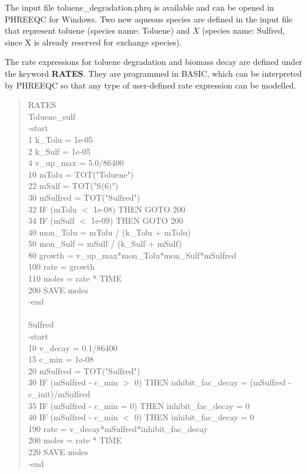 The input file {\color{red}toluene\_degradation.phrq} is available and can be opened
in PHREEQC for Windows. Two new aqueous species are defined in the input file that represent toluene (species name: Toluene) and $X$ (species name: Sulfred, since X is already reserved for exchange species). 

The rate expressions for toluene degradation and biomass decay are defined under the keyword \textbf{RATES}. They are programmed in BASIC, which can be interpreted by PHREEQC so that any type of user-defined rate expression can be modelled.

\begin{quote}
{\color{red}
	RATES \\
	Toluene\_sulf \\
    -start \\
    1   k\_Tolu    = 1e-05 \\
    2   k\_Sulf    = 1e-05 \\
    4   v\_up\_max  = 5.0/86400 \\
    10  mTolu     = TOT("Toluene") \\
    22  mSulf     = TOT("S(6)") \\
    30  mSulfred  = TOT("Sulfred") \\
    32  IF (mTolu $<$ 1e-08) THEN GOTO 200 \\
    34  IF (mSulf $<$ 1e-09) THEN GOTO 200 \\
    40  mon\_Tolu  = mTolu / (k\_Tolu + mTolu) \\
    50  mon\_Sulf  = mSulf / (k\_Sulf + mSulf) \\
    80  growth    = v\_up\_max*mon\_Tolu*mon\_Sulf*mSulfred \\
    100 rate      = growth \\
    110 moles     = rate * TIME \\
    200 SAVE moles \\
    -end \\ 
}
 \\
{\color{red}
Sulfred \\
    -start \\
   10 v\_decay   = 0.1/86400 \\
   15 c\_min     = 1e-08 \\
   20 mSulfred  = TOT("Sulfred") \\
   30 IF (mSulfred - c\_min  $>$ 0) THEN inhibit\_fac\_decay = (mSulfred - c\_init)/mSulfred \\
   35 IF (mSulfred - c\_min  = 0) THEN inhibit\_fac\_decay = 0 \\
   40 IF (mSulfred - c\_min  $<$ 0) THEN inhibit\_fac\_decay = 0 \\
  190 rate      = v\_decay*mSulfred*inhibit\_fac\_decay \\
  200 moles     = rate * TIME \\
  220 SAVE moles \\
 -end \\
}
\end{quote}

